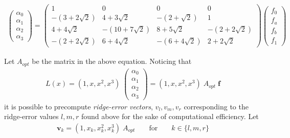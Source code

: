 \begin{align}
\begin{pmatrix}\alpha_0\\\alpha_1\\\alpha_2\\\alpha_3\end{pmatrix} =
\begin{pmatrix}1&0&0&0\\
-(3+2\sqrt{2})&4+3\sqrt{2}&-(2+\sqrt{2})&1\\
4+4\sqrt{2}&-(10+7\sqrt{2})&8+5\sqrt{2}&-(2+2\sqrt{2})\\
-(2+2\sqrt{2})&6+4\sqrt{2}&-(6+4\sqrt{2})&2+2\sqrt{2}
\end{pmatrix}
\begin{pmatrix}f_0\\f_a\\f_b\\f_1\end{pmatrix}
\label{eq:LagrangeCoefficients}
\end{align}

Let $A_{opt}$ be the matrix in the above equation. Noticing that
\begin{align*}
L(x) = (1,x,x^2,x^3)\;\begin{pmatrix}\alpha_0\\\alpha_1\\\alpha_2\\\alpha_3\end{pmatrix} = (1,x,x^2,x^3)\;A_{opt}\;\mathbf{f}
\end{align*}
it is possible to precompute \emph{ridge-error vectors}, $v_l, v_m, v_r$ corresponding to the ridge-error values $l, m, r$ found above for the sake of computational efficiency. Let
\begin{align*}
\mathbf{v}_k = (1,x_k,x_k^2,x_k^3)\;A_{opt} && \text{ for } && k \in \{l, m, r\}
\end{align*}
